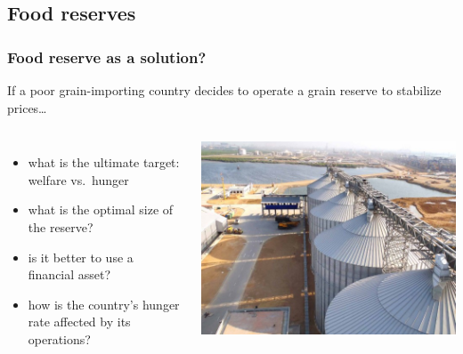 \documentclass[svgnames]{beamer}
\begin{document}
\subsection{Food reserves}
\begin{frame}
\frametitle{Food reserve as a solution?}
If a poor grain-importing country decides to operate a grain reserve to stabilize prices\dots
\begin{columns}
\begin{itemize}[<+->]
\item what is the ultimate target: welfare vs.~hunger
\item what is the optimal size of the reserve?
\item is it better to use a financial asset?
\item \alert{how is the country's hunger rate affected by its operations?}
\end{itemize}
\includegraphics[width=\linewidth]{pic-silos2}
\end{columns}
\end{frame}
\end{document}
